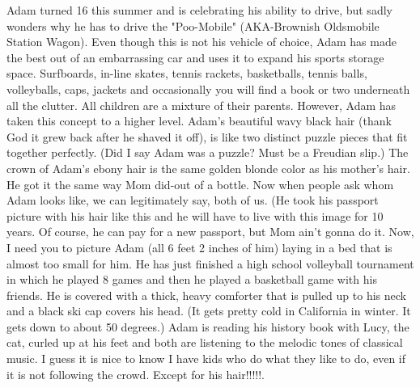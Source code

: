 Adam turned 16 this summer and is celebrating his ability to drive, but sadly wonders why he has to drive the "Poo-Mobile" (AKA-Brownish
Oldsmobile Station Wagon). Even though this is not his vehicle of choice, Adam has made the best out of an embarrassing car and uses it to
expand his sports storage space. Surfboards, in-line skates, tennis rackets, basketballs, tennis balls, volleyballs, caps, jackets and
occasionally you will find a book or two underneath all the clutter. All children are a mixture of their parents. However, Adam has taken this
concept to a higher level. Adam's beautiful wavy black hair (thank God it grew back after he shaved it off), is like two distinct puzzle pieces
that fit together perfectly. (Did I say Adam was a puzzle? Must be a Freudian slip.) The crown of Adam's ebony hair is the same golden blonde
color as his mother's hair. He got it the same way Mom did-out of a bottle. Now when people ask whom Adam looks like, we can legitimately say,
both of us.   (He took his passport picture with his hair like this and he will have to live with this image for 10 years. Of course, he can pay
for a new passport, but Mom ain't gonna do it. Now, I need you to picture Adam (all 6 feet 2 inches of him) laying in a bed that is almost too
small for him. He has just finished a high school volleyball tournament in which he played 8 games and then he played a basketball game with his
friends. He is covered with a thick, heavy comforter that is pulled up to his neck and a black ski cap covers his head. (It gets pretty cold in
California in winter. It gets down to about 50 degrees.) Adam is reading his history book with Lucy, the cat, curled up at his feet and both are
listening to the melodic tones of classical music. I guess it is nice to know I have kids who do what they like to do, even if it is not
following the crowd. Except for his hair!!!!!.

